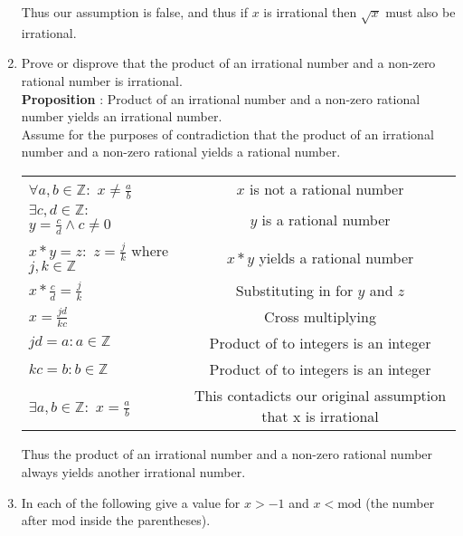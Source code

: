 \documentclass[a4paper,11pt]{article}
\begin{document}
\begin{enumerate}
Thus our assumption is false, and thus if $x$ is irrational then $\sqrt{x}$ must also be irrational.



\item Prove or disprove that the product of an irrational number and a non-zero rational number is irrational. \\
\textbf{Proposition} : Product of an irrational number and a non-zero rational number yields an irrational number. \\[.1in]
Assume for the purposes of contradiction that the product of an irrational number and a non-zero rational yields a rational number. \\
\begin{tabular}{l | c}
$\forall a,b \in \mathbb{Z} :$ $x \neq \frac{a}{b}$                 & $x$ is not a rational number \\
$\exists c,d \in \mathbb{Z} :$ $y = \frac{c}{d} \wedge c \neq 0$    & $y$ is a rational number \\
$x*y = z :$ $z = \frac{j}{k}$ where $j,k \in \mathbb{Z}$            & $x*y$ yields a rational number \\
$x*\frac{c}{d} = \frac{j}{k}$                                       & Substituting in for $y$ and $z$ \\
$x = \frac{jd}{kc}$                                                 & Cross multiplying \\
$jd = a : a \in \mathbb{Z}$                                         & Product of to integers is an integer \\
$kc = b : b \in \mathbb{Z}$                                         & Product of to integers is an integer \\
$\exists a,b \in \mathbb{Z} : $ $x = \frac{a}{b}$                   & This contadicts our original assumption that x is irrational \\
\end{tabular}   

Thus the product of an irrational number and a non-zero rational number always yields another irrational number. \\


\item  In each of the following give a value for $x > -1$ and $x < \text{mod}$ (the number after mod inside the parentheses).


\end{enumerate}
\end{document}
